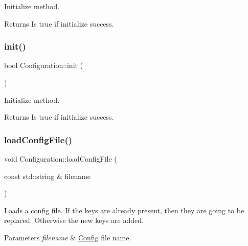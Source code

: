 Initialize method.

\begin{DoxyReturn}{Returns}
Is true if initialize success. 
\end{DoxyReturn}
\mbox{\label{classConfiguration_a4eac7383dc99601820516eef2d1dce85}} 
\subsubsection{\texorpdfstring{init()}{init()}\hspace{0.1cm}{\footnotesize\ttfamily [2/2]}}
{\footnotesize\ttfamily bool Configuration\+::init (\begin{DoxyParamCaption}{ }\end{DoxyParamCaption})}

Initialize method.

\begin{DoxyReturn}{Returns}
Is true if initialize success. 
\end{DoxyReturn}
\mbox{\label{classConfiguration_a1204d5d346ef086d437babc75677293d}} 
\subsubsection{\texorpdfstring{load\+Config\+File()}{loadConfigFile()}\hspace{0.1cm}{\footnotesize\ttfamily [1/2]}}
{\footnotesize\ttfamily void Configuration\+::load\+Config\+File (\begin{DoxyParamCaption}\item[{const std\+::string \&}]{filename }\end{DoxyParamCaption})}

Loads a config file. If the keys are already present, then they are going to be replaced. Otherwise the new keys are added.


\begin{DoxyParams}{Parameters}
{\em filename} & \hyperlink{classConfig}{Config} file name. \\
\hline
\end{DoxyParams}
\mbox{\label{classConfiguration_a1204d5d346ef086d437babc75677293d}} 
